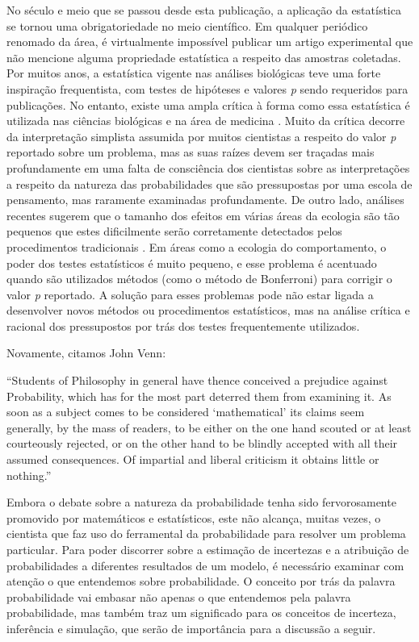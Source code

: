 \documentclass[12pt,a4paper]{article}
\begin{document}
No século e meio que se passou desde esta publicação, a aplicação da estatística se tornou uma obrigatoriedade no meio científico.
Em qualquer periódico renomado da área, é virtualmente impossível publicar um artigo experimental que não 
mencione alguma propriedade
estatística a respeito das amostras coletadas. Por muitos anos, a estatística vigente nas análises biológicas teve uma
forte inspiração frequentista, com testes de hipóteses e valores {\em p} sendo requeridos para publicações. 
No entanto, existe uma ampla crítica à forma como essa estatística é
utilizada nas ciências biológicas e na área de medicina \cite{Ioannidis05}.
Muito da crítica decorre da interpretação
simplista assumida por muitos cientistas a respeito do valor {\em p} reportado sobre um problema, mas as suas raízes devem
ser traçadas mais profundamente em uma falta de consciência dos cientistas sobre as interpretações a respeito da natureza
das probabilidades que são pressupostas por uma escola de pensamento, mas raramente examinadas profundamente. 
De outro lado, análises recentes sugerem que o tamanho dos efeitos em várias áreas da ecologia são tão pequenos que estes
dificilmente serão corretamente detectados pelos procedimentos tradicionais \cite{Jennions03}. Em áreas como a ecologia do
comportamento, o poder dos testes estatísticos é muito pequeno, e esse problema é acentuado quando são utilizados métodos
(como o método de Bonferroni) para corrigir o valor {\em p} reportado. A solução para esses problemas pode não estar ligada
a desenvolver novos métodos ou procedimentos estatísticos, mas na análise crítica e racional dos pressupostos por trás
dos testes frequentemente utilizados.

Novamente, citamos John Venn:

``Students of Philosophy in general have thence conceived a prejudice against Probability, which has for the most part
deterred them from examining it. As soon as a subject comes to be considered `mathematical' its claims seem generally,
by the mass of readers, to be either on the one hand scouted or at least courteously rejected, or on the other hand
to be blindly accepted with all their assumed consequences. Of impartial and liberal criticism it obtains little or nothing.''
\cite{Venn1866}

Embora o debate sobre a natureza da probabilidade tenha sido fervorosamente promovido por matemáticos e estatísticos,
este não alcança, muitas vezes, o cientista que faz uso do ferramental da probabilidade para resolver um problema particular.
Para poder discorrer sobre a estimação de incertezas e a atribuição de probabilidades a diferentes resultados de um modelo,
é necessário examinar com atenção o que entendemos sobre probabilidade. O conceito por trás da palavra probabilidade vai
embasar não apenas o que entendemos pela palavra probabilidade, mas também traz um significado para os conceitos de
incerteza, inferência e simulação, que serão de importância para a discussão a seguir.
\end{document}
